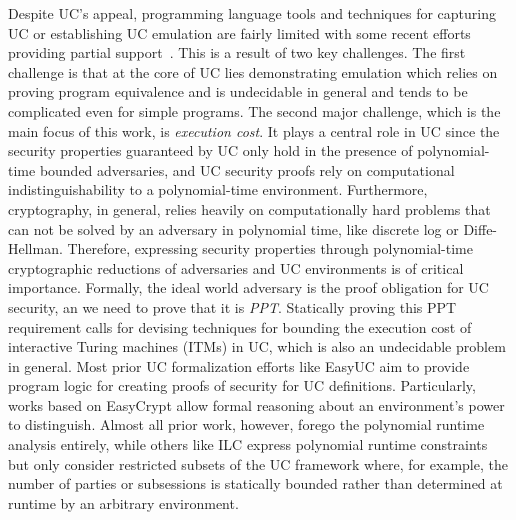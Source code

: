 Despite UC's appeal, programming language tools and techniques for capturing UC or establishing UC emulation are fairly limited with some recent efforts providing
partial support~\cite{ilc,easyuc,ipdl,symbolicuc,barbosa}. This is a result of two key challenges.
The first challenge is that at the core of UC lies demonstrating emulation which relies on proving program equivalence and is undecidable in general
and tends to be complicated even for simple programs.
The second major challenge, which is the main focus of this work, is \emph{execution cost}. It plays a central role in UC since the security properties
guaranteed by UC only hold in the presence of polynomial-time bounded adversaries, and UC security proofs rely on computational indistinguishability to a polynomial-time environment. 
Furthermore, cryptography, in general, relies heavily on computationally hard problems that can not be solved by an adversary in polynomial time, like discrete log or Diffe-Hellman. 
Therefore, expressing security properties 
through polynomial-time cryptographic reductions of adversaries and UC environments is of critical importance.
Formally, the ideal world adversary is the proof obligation for UC security, an we need to prove that it is \emph{PPT}.
Statically proving this PPT requirement calls for devising techniques for bounding the execution cost of interactive Turing machines (ITMs) in UC,
which is also an undecidable problem in general.
Most prior UC formalization efforts like EasyUC aim to provide program logic for creating proofs of security for UC definitions\cite{ipdl,barbosa,easyuc}. 
Particularly, works based on EasyCrypt \cite{easyuc,barbosa} allow formal reasoning about an environment's power to distinguish.
Almost all prior work, however, forego the polynomial runtime analysis entirely, while others like ILC express polynomial runtime constraints but only consider restricted subsets of the UC framework where, for example, the number of parties or subsessions is statically bounded rather than determined at runtime by an arbitrary environment.


